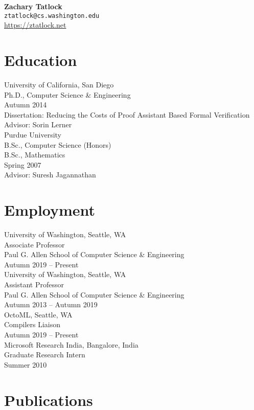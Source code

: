 \documentclass[10pt]{article}
\begin{document}
{\LARGE \textbf{Zachary Tatlock}} \\
\texttt{ztatlock@cs.washington.edu} \\
\url{https://ztatlock.net}

\section*{Education}

University of California, San Diego \\
Ph.D., Computer Science \& Engineering \\
Autumn 2014 \\
Dissertation: Reducing the Costs of Proof Assistant Based Formal Verification \\
Advisor: Sorin Lerner \\

Purdue University \\
B.Sc., Computer Science (Honors) \\
B.Sc., Mathematics \\
Spring 2007 \\
Advisor: Suresh Jagannathan

\section*{Employment}

University of Washington, Seattle, WA \\
Associate Professor \\
Paul G. Allen School of Computer Science \& Engineering \\
Autumn 2019 -- Present \\

University of Washington, Seattle, WA \\
Assistant Professor \\
Paul G. Allen School of Computer Science \& Engineering \\
Autumn 2013 -- Autumn 2019 \\

OctoML, Seattle, WA \\
Compilers Liaison \\
Autumn 2019 -- Present \\

Microsoft Research India, Bangalore, India \\
Graduate Research Intern \\
Summer 2010

\section*{Publications}
\end{document}
